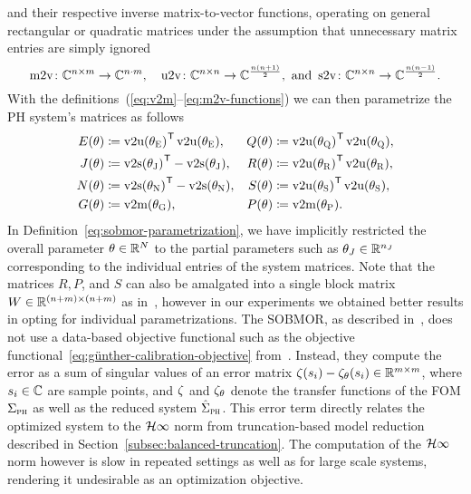 and their respective inverse matrix-to-vector functions, operating on general rectangular or quadratic matrices under the assumption that unnecessary matrix entries are simply ignored
\begin{equation}\label{eq:m2v-functions}
    \mathop{}\!\mathrm{m}2\mathrm{v} \colon \mathbb{C}^{n \times m} \to \mathbb{C}^{n \cdot m},\quad \mathop{}\!\mathrm{u}2\mathrm{v} \colon \mathbb{C}^{n \times n} \to \mathbb{C}^{\frac{n (n + 1)}{2}}, \text{ and } \mathop{}\!\mathrm{s}2\mathrm{v} \colon \mathbb{C}^{n \times n} \to \mathbb{C}^{\frac{n (n - 1)}{2}}.
\end{equation}
With the definitions~(\ref{eq:v2m}--\ref{eq:m2v-functions}) we can then parametrize the \ac{PH} system's matrices as follows
\begin{equation}\label{eq:sobmor-parametrization}
    \begin{alignedat}{3}
        E(\theta) &\coloneqq {\vecupper(\theta_\msc{E})}\trans \vecupper(\theta_\msc{E}),\quad &Q(\theta) &\coloneqq {\vecupper(\theta_\msc{Q})}\trans \vecupper(\theta_\msc{Q}), \\
        J(\theta) &\coloneqq {\vecstrict(\theta_\msc{J})}\trans - \vecstrict(\theta_\msc{J}),\quad &R(\theta) &\coloneqq {\vecupper(\theta_\msc{R})}\trans \vecupper(\theta_\msc{R}), \\
        N(\theta) &\coloneqq {\vecstrict(\theta_\msc{N})}\trans - \vecstrict(\theta_\msc{N}),\quad &S(\theta) &\coloneqq {\vecupper(\theta_\msc{S})}\trans \vecupper(\theta_\msc{S}), \\
        G(\theta) &\coloneqq \vecmat(\theta_\msc{G}),\quad &P(\theta) &\coloneqq \vecmat(\theta_\msc{P}).
    \end{alignedat}
\end{equation}
In Definition~\eqref{eq:sobmor-parametrization}, we have implicitly restricted the overall parameter $\theta \in \mathbb{R}^N$ to the partial parameters such as $\theta_J \in \mathbb{R}^{n_J}$ corresponding to the individual entries of the system matrices.
Note that the matrices $R, P$, and $S$ can also be amalgated into a single block matrix $W \in \mathbb{R}^{(n + m) \times (n + m)}$ as in~\cite{Schwerdtner2021}, however in our experiments we obtained better results in opting for individual parametrizations.
The \ac{SOBMOR}, as described in~\cite{SV2023}, does not use a data-based objective functional such as the objective functional~\eqref{eq:günther-calibration-objective} from~\cite{Günther2023}.
Instead, they compute the error as a sum of singular values of an error matrix $\zeta(s_i) - \zeta_\theta(s_i) \in \mathbb{R}^{m \times m}$, where $s_i \in \mathbb{C}$ are sample points, and $\zeta$ and $\zeta_\theta$ denote the transfer functions of the \ac{FOM} $\Sigma_{\textnormal{\scshape ph}}$ as well as the reduced system $\hat{\Sigma}_{\textnormal{\scshape ph}}$.
This error term directly relates the optimized system to the $\mathcal{H}\infty$ norm from truncation-based model reduction described in Section~\ref{subsec:balanced-truncation}.
The computation of the $\mathcal{H}\infty$ norm however is slow in repeated settings as well as for large scale systems, rendering it undesirable as an optimization objective.

